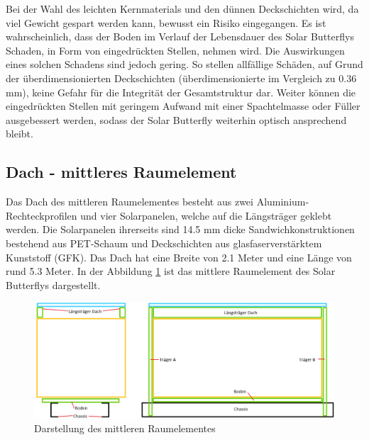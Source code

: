 Bei der Wahl des leichten Kernmaterials und den dünnen Deckschichten wird, da viel Gewicht gespart werden kann, bewusst ein Risiko eingegangen. Es ist wahrscheinlich, dass der Boden im Verlauf der Lebensdauer des Solar Butterflys Schaden, in Form von eingedrückten Stellen, nehmen wird. Die Auswirkungen eines solchen Schadens sind jedoch gering. So stellen allfällige Schäden, auf Grund der überdimensionierten Deckschichten (überdimensionierte im Vergleich zu 0.36 mm), keine Gefahr für die Integrität der Gesamtstruktur dar. Weiter können die eingedrückten Stellen mit geringem Aufwand mit einer Spachtelmasse oder Füller ausgebessert werden, sodass der Solar Butterfly weiterhin optisch ansprechend bleibt.

\subsection{Dach - mittleres Raumelement}
\label{sec:Dach}
Das Dach des mittleren Raumelementes besteht aus zwei Aluminium-Rechteckprofilen und vier Solarpanelen, welche auf die Längsträger geklebt werden. Die Solarpanelen ihrerseits sind 14.5 mm dicke Sandwichkonstruktionen bestehend aus PET-Schaum und Deckschichten aus glasfaserverstärktem Kunststoff (GFK). Das Dach hat eine Breite von 2.1 Meter und eine Länge von rund 5.3 Meter. In der Abbildung \ref{img:Dach} ist das mittlere Raumelement des Solar Butterflys dargestellt.\\

\begin{figure}[h]
  \includegraphics[width=\linewidth]{04_Figures/Dach.png}
  \caption{Darstellung des mittleren Raumelementes}
  \label{img:Dach}
\end{figure}

